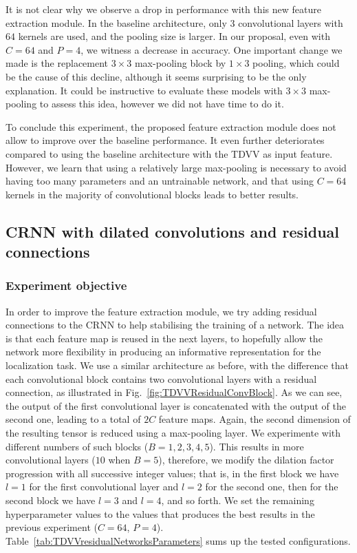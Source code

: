 It is not clear why we observe a drop in performance with this new feature extraction module. In the baseline architecture, only $3$ convolutional layers with $64$ kernels are used, and the pooling size is larger. In our proposal, even with $C=64$ and $P=4$, we witness a decrease in accuracy. One important change we made is the replacement $3 \times 3$ max-pooling block by $1 \times 3$ pooling, which could be the cause of this decline, although it seems surprising to be the only explanation. It could be instructive to evaluate these models with $3 \times 3$ max-pooling to assess this idea, however we did not have time to do it.

To conclude this experiment, the proposed feature extraction module does not allow to improve over the baseline performance. It even further deteriorates compared to using the baseline architecture with the TDVV as input feature. However, we learn that using a relatively large max-pooling is necessary to avoid having too many parameters and an untrainable network, and that using $C=64$ kernels in the majority of convolutional blocks leads to better results.

\subsection{CRNN with dilated convolutions and residual connections}
\subsubsection{Experiment objective}

In order to improve the feature extraction module, we try adding residual connections to the CRNN to help stabilising the training of a network. The idea is that each feature map is reused in the next layers, to hopefully allow the network more flexibility in producing an informative representation for the localization task. We use a similar architecture as before, with the difference that each convolutional block contains two convolutional layers with a residual connection, as illustrated in Fig.~\ref{fig:TDVVResidualConvBlock}. As we can see, the output of the first convolutional layer is concatenated with the output of the second one, leading to a total of $2C$ feature maps. Again, the second dimension of the resulting tensor is reduced using a max-pooling layer. We experimente with different numbers of such blocks ($B=1,2,3,4,5$). This results in more convolutional layers ($10$ when $B=5$), therefore, we modify the dilation factor progression with all successive integer values; that is, in the first block we have $l=1$ for the first convolutional layer and $l=2$ for the second one, then for the second block we have $l=3$ and $l=4$, and so forth. We set the remaining hyperparameter values to the values that produces the best results in the previous experiment ($C=64$, $P=4$). Table~\ref{tab:TDVVresidualNetworksParameters} sums up the tested configurations.

